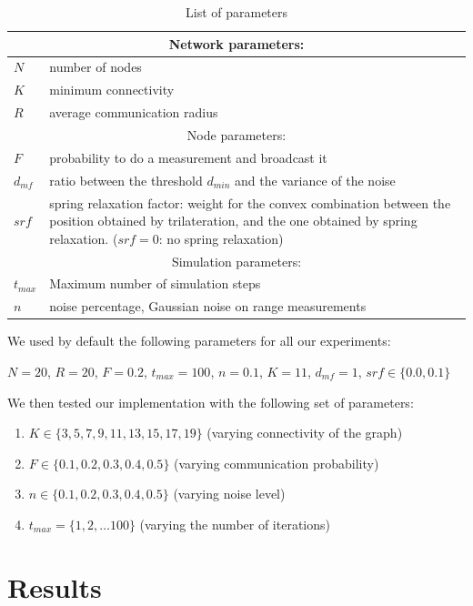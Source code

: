 \documentclass[letterpaper, 10 pt, conference]{ieeeconf}  %
\begin{document}
\begin{table}[!hbt]
\begin{tabularx}{8.4cm}{|p{1cm}|p{6.5cm}|}
\hline
\multicolumn{2}{|c|}{Network parameters:} \\
\hline
$N$ & number of nodes \\
$K$ & minimum connectivity \\
$R$ & average communication radius \\
\hline
\multicolumn{2}{|c|}{Node parameters:} \\
\hline
$F$ & probability to do a measurement and broadcast it \\
$d_{mf}$ & ratio between the threshold $d_{min}$ and the variance of the noise \\
$srf$ & spring relaxation factor: weight for the convex combination between the position obtained by trilateration, and the one obtained by spring relaxation. ($srf=0$: no spring relaxation) \\
\hline
\multicolumn{2}{|c|}{Simulation parameters:} \\
\hline
$t_{max}$ & Maximum number of simulation steps \\
$n$ & noise percentage, Gaussian noise on range measurements \\
\hline
\end{tabularx}
\caption{\label{table:parameters}List of parameters}
\end{table}

We used by default the following parameters for all our experiments: 

$N = 20$, $R = 20$, $F = 0.2$, $t_{max} = 100$, $n = 0.1$, $K = 11$, $d_{mf}=1$, $srf \in \{0.0, 0.1\}$

We then tested our implementation with the following set of parameters:

\begin{enumerate}
\item $K \in \{3, 5, 7, 9, 11, 13, 15, 17, 19\}$ (varying connectivity of the graph)
\item $F \in \{0.1, 0.2, 0.3, 0.4, 0.5\}$ (varying communication probability)
\item $n \in \{0.1, 0.2, 0.3, 0.4, 0.5\}$ (varying noise level)
\item $t_{max} = \{1, 2, \ldots 100\}$ (varying the number of iterations)
\end{enumerate}

\section{Results}
\end{document}
